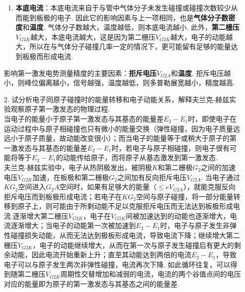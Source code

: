 \documentclass[UTF8,10pt,a4paper]{article}
\begin{document}
\begin{enumerate}
\begin{enumerate}
        \item \textbf{本底电流}：本底电流来自于与管中气体分子未发生碰撞或碰撞次数较少从而能到板极的电子. 因此它的影响因素与上一项相同，也是\textbf{气体分子数密度}和\textbf{温度}. 气体分子数越大，温度越低，则本底电流越小.
        此外，\textbf{第二栅压}$V_{G2K}$越大，本底电流越大，这是因为第二栅压$V_{G2K}$越大，电子的动能越大，所以在与气体分子碰撞几率一定的情况下，更可能留有足够的能量达到板极而形成电流.
    \end{enumerate}
    影响第一激发电势测量精度的主要因素：\textbf{拒斥电压}$V_{G2A}$和\textbf{温度}. 拒斥电压越小，则峰位偏离越小，信号越强，温度越低，则多普勒展宽越小，精度越高.
    \item[2.] 试分析电子同原子碰撞时的能量转移和电子动能关系，解释夫兰克-赫兹实验观察原子第一激发态的物理过程.\\
    当电子的能量小于原子第一激发态与其基态的能量差$E_2-E_1$时，即使电子在运动过程中与原子相碰撞也只有微小的能量交换（弹性碰撞，因为电子质量远远小于原子质量，故动能改变很小）；而当电子的能量等于或稍大于原子的第一激发态与其基态的能量差$E_2-E_1$时，若电子与原子相碰撞，则电子很有可能将等于$E_2-E_1$的动能传给原子，而将原子从基态激发到第一激发态.\\
    夫兰克-赫兹实验中，电子从热阴极发出，被阴极$K$和第二栅极$G_2$之间的加速电压$V_{G2K}$加速，在板极和第二栅极$G_2$之间加有反向拒斥电压$V_{G2A}$. 当电子通过$KG_2$空间进入$G_2A$空间时，如果有足够大的能量（$\leq eV_{G2A}$），就能克服反向拒斥电压而到板极形成电流；若电子在$KG_2$空间与原子碰撞，将一部分能量转移到原子上，则可能由于所剩动能不足以克服拒斥电压而无法达到板极形成电流.逐渐增大第二栅压$V_{G2K}$，电子在$V_{G2K}$间被加速达到的动能也逐渐增大，电流逐渐增大；当电子的动能第一次被加速到$E_2-E_1$时，电子与原子发生非弹性碰撞损失动能，从而无法达到极板形成电流，导致电流下降；继续增大第二栅压$V_{G2K}$，电子的动能继续增大，从而在第一次与原子发生碰撞后有更大的剩余动能，因此电流开始重新上升；直至其动能达到两倍的电流$E_2-E_1$，导致电子可以与原子发生两次非弹性碰撞，电流再次下降. 如此循环往复，可以得到随第二栅压$V_{G2K}$周期性交替增加和减弱的电流，电流的两个谷值点间的电压对应的能量即为原子的第一激发态与其基态之间的能量差.
\end{enumerate}
\end{document}
